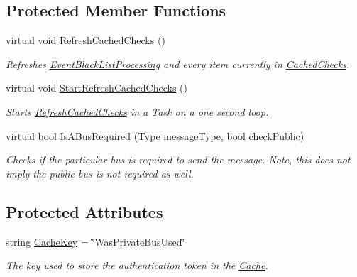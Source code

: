 \subsection*{Protected Member Functions}
\begin{DoxyCompactItemize}
\item 
virtual void \hyperlink{classCqrs_1_1Bus_1_1BusHelper_ad589391a51cd61673d2403ee8012e713_ad589391a51cd61673d2403ee8012e713}{Refresh\+Cached\+Checks} ()
\begin{DoxyCompactList}\small\item\em Refreshes \hyperlink{classCqrs_1_1Bus_1_1BusHelper_ae8d3525369ee9572de06f935cc09510b_ae8d3525369ee9572de06f935cc09510b}{Event\+Black\+List\+Processing} and every item currently in \hyperlink{classCqrs_1_1Bus_1_1BusHelper_ae29e80bd315b6284509c9fd0b977d2a0_ae29e80bd315b6284509c9fd0b977d2a0}{Cached\+Checks}. \end{DoxyCompactList}\item 
virtual void \hyperlink{classCqrs_1_1Bus_1_1BusHelper_a23bfab1be70af651cc48033fcdf4ce2c_a23bfab1be70af651cc48033fcdf4ce2c}{Start\+Refresh\+Cached\+Checks} ()
\begin{DoxyCompactList}\small\item\em Starts \hyperlink{classCqrs_1_1Bus_1_1BusHelper_ad589391a51cd61673d2403ee8012e713_ad589391a51cd61673d2403ee8012e713}{Refresh\+Cached\+Checks} in a Task on a one second loop. \end{DoxyCompactList}\item 
virtual bool \hyperlink{classCqrs_1_1Bus_1_1BusHelper_a381e4fe33069cf8df5349c9cd376f337_a381e4fe33069cf8df5349c9cd376f337}{Is\+A\+Bus\+Required} (Type message\+Type, bool check\+Public)
\begin{DoxyCompactList}\small\item\em Checks if the particular bus is required to send the message. Note, this does not imply the public bus is not required as well. \end{DoxyCompactList}\end{DoxyCompactItemize}
\subsection*{Protected Attributes}
\begin{DoxyCompactItemize}
\item 
string \hyperlink{classCqrs_1_1Bus_1_1BusHelper_a3777deb7ef63b54f57d45a31df157738_a3777deb7ef63b54f57d45a31df157738}{Cache\+Key} = \char`\"{}Was\+Private\+Bus\+Used\char`\"{}
\begin{DoxyCompactList}\small\item\em The key used to store the authentication token in the \hyperlink{namespaceCqrs_1_1Cache}{Cache}. \end{DoxyCompactList}\end{DoxyCompactItemize}
